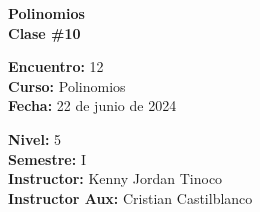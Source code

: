 \begin{center} \textbf
{
    \Large Polinomios \\ \vspace{2mm}Clase \#10
}
\end{center}

\begin{multicols}{2}
{
    \textbf{Encuentro:} 12\\
    \textbf{Curso:} Polinomios\\
    \textbf{Fecha:} 22 de junio de 2024\\
    \begin{flushright}
        \textbf{Nivel:} 5\\
        \textbf{Semestre:} I\\
        \textbf{Instructor:} Kenny Jordan Tinoco\\
        \textbf{Instructor Aux:} Cristian Castilblanco
    \end{flushright}
}
\end{multicols}

\thispagestyle{first-page-style}